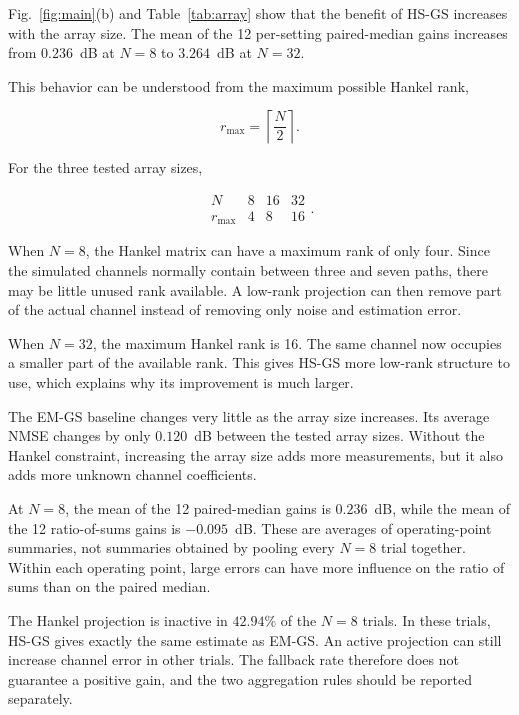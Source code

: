 \documentclass[journal]{IEEEtran}
\begin{document}
Fig.~\ref{fig:main}(b) and Table~\ref{tab:array} show that the benefit of
HS-GS increases with the array size. The mean of the 12 per-setting
paired-median gains increases from
$0.236$~dB at $N=8$ to $3.264$~dB at $N=32$.

This behavior can be understood from the maximum possible Hankel rank,

\begin{equation}
r_{\max}
=
\left\lceil\frac{N}{2}\right\rceil.
\end{equation}

For the three tested array sizes,

\begin{equation}
\begin{array}{c|ccc}
N & 8 & 16 & 32 \\
\hline
r_{\max} & 4 & 8 & 16
\end{array}.
\end{equation}

When $N=8$, the Hankel matrix can have a maximum rank of only four. Since
the simulated channels normally contain between three and seven paths,
there may be little unused rank available. A low-rank projection can then
remove part of the actual channel instead of removing only noise and
estimation error.

When $N=32$, the maximum Hankel rank is 16. The same channel now occupies
a smaller part of the available rank. This gives HS-GS more low-rank
structure to use, which explains why its improvement is much larger.

The EM-GS baseline changes very little as the array size increases. Its
average NMSE changes by only $0.120$~dB between the tested array sizes.
Without the Hankel constraint, increasing the array size adds more
measurements, but it also adds more unknown channel coefficients.

At $N=8$, the mean of the 12 paired-median gains is $0.236$~dB, while
the mean of the 12 ratio-of-sums gains is $-0.095$~dB. These are averages
of operating-point summaries, not summaries obtained by pooling every
$N=8$ trial together. Within each operating point, large errors can have
more influence on the ratio of sums than on the paired median.

The Hankel projection is inactive in $42.94\%$ of the $N=8$ trials. In
these trials, HS-GS gives exactly the same estimate as EM-GS. An active
projection can still increase channel error in other trials. The fallback
rate therefore does not guarantee a positive gain, and the two aggregation
rules should be reported separately.
\end{document}
